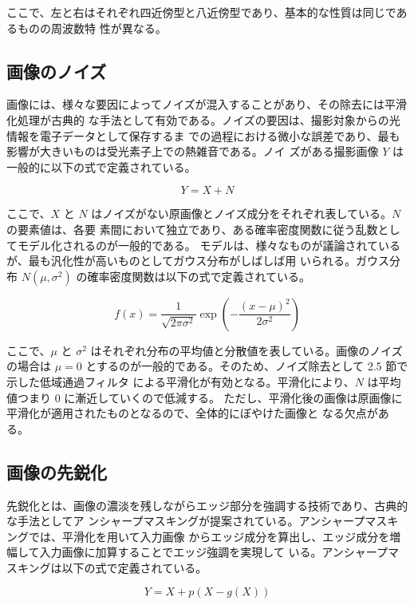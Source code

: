 \documentclass[dvipdfmx]{jsarticle}
\begin{document}
ここで、左と右はそれぞれ四近傍型と八近傍型であり、基本的な性質は同じであるものの周波数特
性が異なる。

\subsection{画像のノイズ}

画像には、様々な要因によってノイズが混入することがあり、その除去には平滑化処理が古典的
な手法として有効である。ノイズの要因は、撮影対象からの光情報を電子データとして保存するま
での過程における微小な誤差であり、最も影響が大きいものは受光素子上での熱雑音である。ノイ
ズがある撮影画像 $Y$ は一般的に以下の式で定義されている。

\begin{equation}
Y = X + N
\tag{10}
\end{equation}

ここで、$X$ と $N$ はノイズがない原画像とノイズ成分をそれぞれ表している。$N$ の要素値は、各要
素間において独立であり、ある確率密度関数に従う乱数としてモデル化されるのが一般的である。
モデルは、様々なものが議論されているが、最も汎化性が高いものとしてガウス分布がしばしば用
いられる。ガウス分布 $N(\mu,\sigma^2)$ の確率密度関数は以下の式で定義されている。

\begin{equation}
f(x)
=
\frac{1}{\sqrt{2\pi\sigma^2}}
\exp
\left(
-\frac{(x-\mu)^2}{2\sigma^2}
\right)
\tag{11}
\end{equation}

ここで、$\mu$ と $\sigma^2$ はそれぞれ分布の平均値と分散値を表している。画像のノイズの場合は
$\mu=0$ とするのが一般的である。そのため、ノイズ除去として 2.5 節で示した低域通過フィルタ
による平滑化が有効となる。平滑化により、$N$ は平均値つまり 0 に漸近していくので低減する。
ただし、平滑化後の画像は原画像に平滑化が適用されたものとなるので、全体的にぼやけた画像と
なる欠点がある。

\subsection{画像の先鋭化}

先鋭化とは、画像の濃淡を残しながらエッジ部分を強調する技術であり、古典的な手法としてア
ンシャープマスキングが提案されている。アンシャープマスキングでは、平滑化を用いて入力画像
からエッジ成分を算出し、エッジ成分を増幅して入力画像に加算することでエッジ強調を実現して
いる。アンシャープマスキングは以下の式で定義されている。

\begin{equation}
Y = X + p(X-g(X))
\tag{12}
\end{equation}
\end{document}
